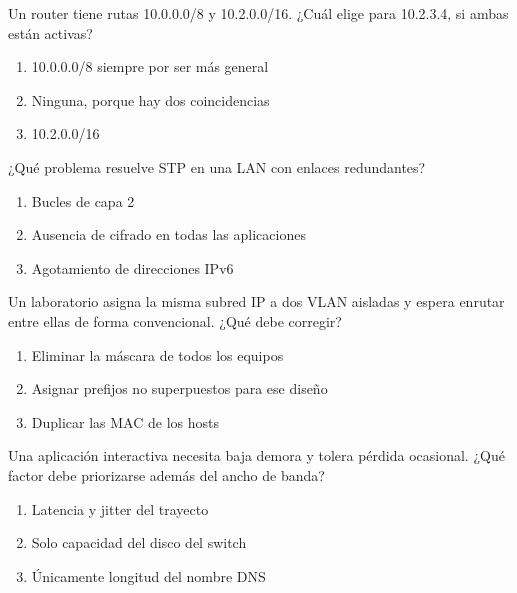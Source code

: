 \noindent\begin{minipage}{\linewidth}\setlength{\parskip}{4pt}\label{q:R-021}
Un router tiene rutas 10.0.0.0/8 y 10.2.0.0/16. ¿Cuál elige para 10.2.3.4, si ambas están activas?
\begin{enumerate}[label=\Alph*),nosep]
\item 10.0.0.0/8 siempre por ser más general
\item Ninguna, porque hay dos coincidencias
\item 10.2.0.0/16
\end{enumerate}\end{minipage}\par\medskip

\noindent\begin{minipage}{\linewidth}\setlength{\parskip}{4pt}\label{q:R-022}
¿Qué problema resuelve STP en una LAN con enlaces redundantes?
\begin{enumerate}[label=\Alph*),nosep]
\item Bucles de capa 2
\item Ausencia de cifrado en todas las aplicaciones
\item Agotamiento de direcciones IPv6
\end{enumerate}\end{minipage}\par\medskip

\noindent\begin{minipage}{\linewidth}\setlength{\parskip}{4pt}\label{q:R-023}
Un laboratorio asigna la misma subred IP a dos VLAN aisladas y espera enrutar entre ellas de forma convencional. ¿Qué debe corregir?
\begin{enumerate}[label=\Alph*),nosep]
\item Eliminar la máscara de todos los equipos
\item Asignar prefijos no superpuestos para ese diseño
\item Duplicar las MAC de los hosts
\end{enumerate}\end{minipage}\par\medskip

\noindent\begin{minipage}{\linewidth}\setlength{\parskip}{4pt}\label{q:R-024}
Una aplicación interactiva necesita baja demora y tolera pérdida ocasional. ¿Qué factor debe priorizarse además del ancho de banda?
\begin{enumerate}[label=\Alph*),nosep]
\item Latencia y jitter del trayecto
\item Solo capacidad del disco del switch
\item Únicamente longitud del nombre DNS
\end{enumerate}\end{minipage}\par\medskip

